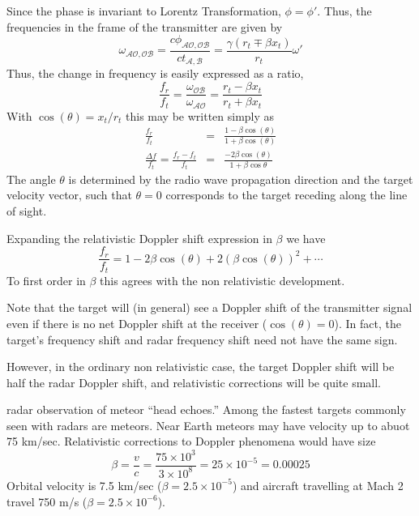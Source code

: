 Since the phase is invariant to Lorentz Transformation, $\phi =
\phi'$.  Thus, the frequencies in the frame of the transmitter are
given by
\begin{equation}
\omega_{\mathcal{AO}, \mathcal{OB}} = 
\frac{c\phi_{\mathcal{AO}, \mathcal{OB}}}
            {ct_{\mathcal{A},\mathcal{B}}} =
\frac{\gamma(r_t \mp \beta x_t)}{r_t}\omega'
\end{equation}
Thus, the change in frequency is easily expressed as a ratio,
\begin{equation}
\frac{f_r}{f_t} = \frac{\omega_{\mathcal{OB}}}{\omega_{\mathcal{AO}}}
= \frac{r_t - \beta x_t}{r_t + \beta x_t}
\end{equation}
With $\cos(\theta) = x_t/r_t$ this may be written simply as
\begin{eqnarray}
\frac{f_r}{f_t} &=& \frac{1 - \beta \cos(\theta)}{1 + \beta \cos(\theta)}\\
\frac{\Delta f}{f_t} = \frac{f_r - f_t}{f_t} &=& \frac{-2\beta\cos(\theta)}{1 + \beta\cos{\theta}}
\end{eqnarray}
The angle $\theta$ is determined by the radio wave propagation
direction and the target velocity vector, such that $\theta = 0$
corresponds to the target receding along the line of sight.

Expanding the relativistic Doppler shift expression in $\beta$ we have
\begin{equation}
\frac{f_r}{f_t} = 
1 - 2\beta\cos(\theta) + 2(\beta\cos(\theta))^2 + \cdots
\end{equation}
To first order in $\beta$ this agrees with the non relativistic
development.

Note that the target will (in general) see a Doppler shift of the
transmitter signal even if there is no net Doppler shift at the
receiver ($\cos(\theta) = 0$).  In fact, the target's frequency shift
and radar frequency shift need not have the same sign.

However, in the ordinary non relativistic case, the target Doppler
shift will be half the radar Doppler shift, and relativistic
corrections will be quite small.

\begin{example} radar observation of meteor ``head echoes.''  Among the
fastest targets commonly seen with radars are meteors.  Near Earth
meteors may have velocity up to abuot 75 km/sec.  Relativistic
corrections to Doppler phenomena would have size
\begin{displaymath}
\beta = \frac{v}{c} = \frac{75\times 10^3}{3\times 10^8} = 25\times
10^{-5} = 0.00025
\end{displaymath}
Orbital velocity is 7.5 km/sec ($\beta = 2.5\times 10^{-5}$) and
aircraft travelling at Mach 2 travel 750 m/s ($\beta = 2.5\times
10^{-6}$).
\end{example}

